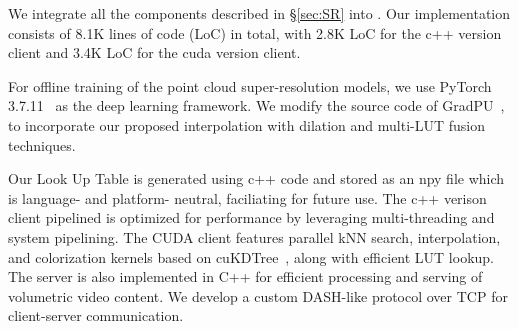 
We integrate all the components described in \S\ref{sec:SR} into  \name. Our implementation consists of 8.1K lines of code (LoC) in total, with 2.8K LoC for the c++ version client and 3.4K LoC for the cuda version client.

For offline training of the point cloud super-resolution models, we use PyTorch 3.7.11~\cite{paszke2017automatic} as the deep learning framework. We modify the source code of  GradPU~\cite{he_grad-pu_2023}, to incorporate our proposed interpolation with dilation and multi-LUT fusion techniques.

Our Look Up Table is generated using c++ code and stored as an npy file which is language- and platform- neutral, faciliating for future use. 
The c++ verison client pipelined is optimized for performance by leveraging multi-threading and system pipelining.  The CUDA client features parallel kNN search, interpolation, and colorization kernels based on cuKDTree~\cite{cudaKDTree}, along with efficient LUT lookup.
The server is also implemented in C++ for efficient processing and serving of volumetric video content. We develop a custom DASH-like protocol over TCP for client-server communication.

